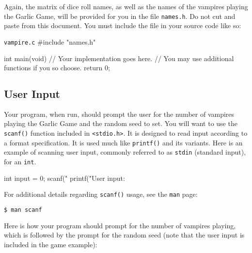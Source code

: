 \documentclass[11pt]{article}
\begin{document}
Again, the matrix of dice roll names, as well as the names of the vampires
playing the Garlic Game, will be provided for you in the file \texttt{names.h}.
Do not cut and paste from this document. You must include the file in your
source code like so:

\begin{codelisting}{\texttt{vampire.c}}
#include "names.h"

int main(void) {
    // Your implementation goes here.
    // You may use additional functions if you so choose.
    return 0;
}
\end{codelisting}

\subsection{User Input}

Your program, when run, should prompt the user for the number of vampires
playing the Garlic Game and the random seed to set. You will want to use the
\texttt{scanf()} function included in \texttt{<stdio.h>}. It is designed to read
input according to a format specification. It is used much like
\texttt{printf()} and its variants.  Here is an example of scanning user input,
commonly referred to as \texttt{stdin} (standard input), for an \texttt{int}.

\begin{codelisting}{}
int input = 0;
scanf("%
printf("User input: %
\end{codelisting}

For additional details regarding \texttt{scanf()} usage, see the \texttt{man}
page:

\begin{lstlisting}[style=bashstyle]
  $ man scanf
\end{lstlisting}

Here is how your program should prompt for the number of vampires playing, which
is followed by the prompt for the random seed (note that the user input is
included in the game example):
\end{document}
